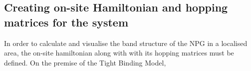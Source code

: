 \subsection{Creating on-site Hamiltonian and hopping matrices for the system}
In order to calculate and visualise the band structure of the NPG in a localised area, the on-site hamiltonian along with with its hopping matrices must be defined. On the premise of the Tight Binding Model, 
